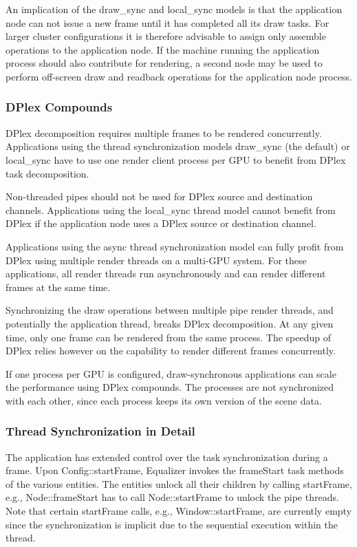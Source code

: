 \documentclass[10pt,a4]{scrartcl}
\begin{document}
An implication of the draw\_sync and local\_sync models is that the application
node can not issue a new frame until it has completed all its draw tasks. For
larger cluster configurations it is therefore advisable to assign only assemble
operations to the application node. If the machine running the application
process should also contribute for rendering, a second node may be used to
perform off-screen draw and readback operations for the application node
process.

\subsubsection{\label{sAdvDPlex}DPlex Compounds}

DPlex decomposition requires multiple frames to be rendered
concurrently. Applications using the thread synchronization models
\textsf{draw\_sync} (the default) or \textsf{local\_sync} have to use
one render client process per GPU to benefit from DPlex task
decomposition.

Non-threaded pipes should not be used for DPlex source and destination
channels. Applications using the \textsf{local\_sync} thread model cannot
benefit from DPlex if the application node uses a DPlex source or destination
channel.

Applications using the \textsf{async} thread synchronization model can
fully profit from DPlex using multiple render threads on a multi-GPU
system. For these applications, all render threads run asynchronously
and can render different frames at the same time.

Synchronizing the draw operations between multiple pipe render threads,
and potentially the application thread, breaks DPlex decomposition. At
any given time, only one frame can be rendered from the same
process. The speedup of DPlex relies however on the capability to
render different frames concurrently.

If one process per GPU is configured, draw-synchronous applications can
scale the performance using DPlex compounds. The processes are not
synchronized with each other, since each process keeps its own version
of the scene data.


\subsubsection{Thread Synchronization in Detail}

The application has extended control over the task synchronization
during a frame. Upon \textsf{Config::startFrame}, Equalizer invokes the
\textsf{frameStart} task methods of the various entities. The entities
unlock all their children by calling \textsf{startFrame}, e.g.,
\textsf{Node::frameStart} has to call \textsf{Node::startFrame}
to unlock the pipe threads. Note that certain \textsf{startFrame} calls,
e.g., \textsf{Window::startFrame}, are currently empty since the
synchronization is implicit due to the sequential execution within the
thread.
\end{document}
